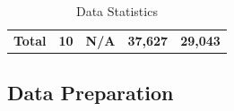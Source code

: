\documentclass[a4paper]{article}
\begin{document}
\begin{table}[htbp]
\begin{tabular}{lcp{5.715em}cc}
    \textbf{Total} & \textbf{10} & \textbf{N/A} & \textbf{37,627} & \textbf{29,043} \\
    \end{tabular}%
  \caption{Data Statistics}
  \label{tab:datastats}%
\end{table}%

\subsection{Data Preparation}
\end{document}
